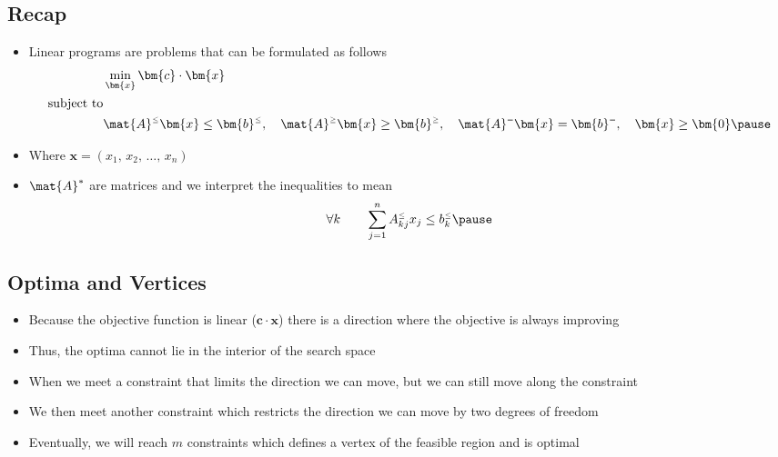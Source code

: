 \begin{slide}
\section{Recap}

\begin{PauseHighLight}
  \begin{itemize}
  \item Linear programs are problems that can be formulated as follows
    \begin{align*}
      &\min_{\bm{x}} \bm{c}\cdot \bm{x} \\
      \text{subject to}&\\
      &\mat{A}^{\scriptscriptstyle \leq} \bm{x} \leq
      \bm{b}^{\scriptscriptstyle \leq},  \quad
      \mat{A}^{\scriptscriptstyle \geq} 
      \bm{x} \geq \bm{b}^{\scriptscriptstyle \geq}, \quad 
      \mat{A}^{\scriptscriptstyle =} \bm{x} = \bm{b}^{\scriptscriptstyle
        =}, \quad \bm{x} \geq \bm{0}\pause 
    \end{align*}
  \item Where $\bm{x} = (x_1,\,x_2,\,\ldots,\,x_n)$\pause
  \item $\mat{A}^{*}$ are matrices and we interpret the inequalities to
    mean
    \begin{align*}
      \forall k \quad\quad \sum_{j=1}^n A_{kj}^{\scriptscriptstyle \leq}
      x_j \leq  b^{\scriptscriptstyle \leq}_k\pause
    \end{align*}
  \end{itemize}
\end{PauseHighLight}
\end{slide}


\begin{slide}
\section{Optima and Vertices}

\begin{PauseHighLight}
  \begin{itemize}
  \item Because the objective function is linear ($\bm{c}\cdot \bm{x}$)
    there is a direction where the objective is always improving\pause
  \item Thus, the optima cannot lie in the interior of the search space\pause
  \item When we meet a constraint that limits the direction we can move,
    but we can still move along the constraint\pause
  \item We then meet another constraint which restricts the direction we
    can move by two degrees of freedom\pause
  \item Eventually, we will reach $m$ constraints which defines a vertex
    of the feasible region and is optimal\pause
  \end{itemize}
\end{PauseHighLight}

\end{slide}


